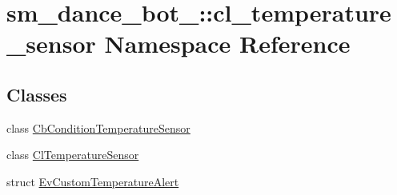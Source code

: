 \hypertarget{namespacesm__dance__bot__3_1_1cl__temperature__sensor}{}\section{sm\+\_\+dance\+\_\+bot\+\_\+:\+:cl\+\_\+temperature\+\_\+sensor Namespace Reference}
\label{namespacesm__dance__bot__3_1_1cl__temperature__sensor}
\subsection*{Classes}
\begin{DoxyCompactItemize}
\item 
class \hyperlink{classsm__dance__bot__3_1_1cl__temperature__sensor_1_1CbConditionTemperatureSensor}{Cb\+Condition\+Temperature\+Sensor}
\item 
class \hyperlink{classsm__dance__bot__3_1_1cl__temperature__sensor_1_1ClTemperatureSensor}{Cl\+Temperature\+Sensor}
\item 
struct \hyperlink{structsm__dance__bot__3_1_1cl__temperature__sensor_1_1EvCustomTemperatureAlert}{Ev\+Custom\+Temperature\+Alert}
\end{DoxyCompactItemize}
